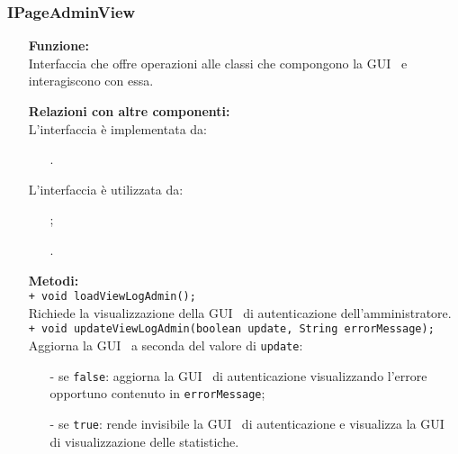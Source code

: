 {\begin{sloppypar}
{{		%
		\subsubsection{IPageAdminView}\label{ssub:IPageAdminView}{
	
			\begin{itemize}
				\item[]  \textbf{Funzione:} \\
				Interfaccia che offre operazioni alle classi che compongono la GUI\g~ e interagiscono con essa.\\
				
				\item[]  \textbf{Relazioni con altre componenti:} \\
				L'interfaccia è implementata da:
				\begin{itemize}
					\item[] .
				\end{itemize}
				L'interfaccia è utilizzata da:
				\begin{itemize}
					\item[] ;
					\item[] .\\
				\end{itemize}
				
				\item[]  \textbf{Metodi:}\\
					\texttt{+ void loadViewLogAdmin();}\\
					Richiede la visualizzazione della GUI\g~ di autenticazione dell'amministratore.\\
					
					\texttt{+ void updateViewLogAdmin(boolean update, String errorMessage);}\\
					Aggiorna la GUI\g~ a seconda del valore di \texttt{update}:
					\begin{itemize}
						\item[-] se \texttt{false}: aggiorna la GUI\g~ di autenticazione visualizzando l'errore opportuno contenuto in \texttt{errorMessage};
						\item[-] se \texttt{true}: rende invisibile la GUI\g~ di autenticazione e visualizza la GUI\g~ di visualizzazione delle statistiche.\\
					\end{itemize}
					

\end{itemize}}}}
\end{sloppypar}}
